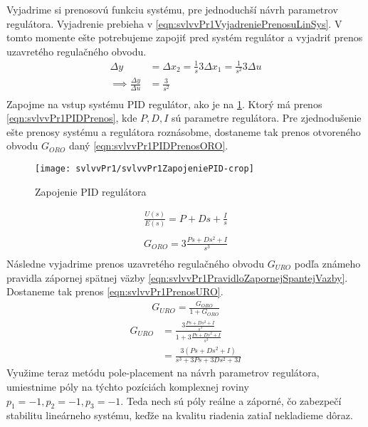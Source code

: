 \documentclass[../main.tex]{subfiles}
\begin{document}
	Vyjadrime si prenosovú funkciu systému, pre jednoduchší návrh parametrov regulátora. Vyjadrenie prebieha v \cref{eqn:svlvvPr1VyjadreniePrenosuLinSys}. V tomto momente ešte potrebujeme zapojiť pred systém regulátor a vyjadriť prenos uzavretého regulačného obvodu.
	\begin{equation}
	\begin{aligned}
		\Delta  y &= \Delta x_2 = \frac{1}{s}  3 \Delta x_1 = \frac{1}{s^2}  3 \Delta u \\
		\implies \frac{\Delta y}{\Delta u } &= \frac{3}{s^2} \\
	\end{aligned}
	\label{eqn:svlvvPr1VyjadreniePrenosuLinSys}
	\end{equation}
	Zapojme na vstup systému PID regulátor, ako je na \cref{fig:svlvvPr1ZapojeinePIDNaLinSys}. Ktorý má prenos \cref{eqn:svlvvPr1PIDPrenos}, kde $P, D, I$ sú parametre regulátora. Pre zjednodušenie ešte prenosy systému a regulátora roznásobme, dostaneme tak prenos otvoreného obvodu $G_{ORO}$ daný \cref{eqn:svlvvPr1PIDPrenosORO}. 
	\begin{figure}[h!]
		\centering
		\texttt{[image: svlvvPr1/svlvvPr1ZapojeniePID-crop]}
		\caption{Zapojenie PID regulátora}
		\label{fig:svlvvPr1ZapojeinePIDNaLinSys}
	\end{figure}
	\begin{equation}
		\begin{aligned}
			\frac{U(s)}{E(s)} = P + Ds + \frac{I}{s} \\
		\end{aligned}
		\label{eqn:svlvvPr1PIDPrenos}
	\end{equation}
	\begin{equation}
	\begin{aligned}
	G_{ORO} = 3\frac{Ps + Ds^2 + I}{s^3} \\
	\end{aligned}
	\label{eqn:svlvvPr1PIDPrenosORO}
	\end{equation}
	Následne vyjadrime prenos uzavretého regulačného obvodu $G_{URO}$ podľa známeho pravidla zápornej spätnej väzby \cref{eqn:svlvvPr1PravidloZapornejSpantejVazby}. Dostaneme tak prenos \cref{eqn:svlvvPr1PrenosURO}.
	\begin{equation}
			\begin{aligned}
			G_{URO} = \frac{G_{ORO}}{1 + G_{ORO}}
			\end{aligned}
			\label{eqn:svlvvPr1PravidloZapornejSpantejVazby}
	\end{equation}
	\begin{equation}
		\begin{aligned}
		G_{URO} &= \frac{3\frac{Ps + Ds^2 + I}{s^3}}{1 + 3\frac{Ps + Ds^2 + I}{s^3}}  \\
		 		&= \frac{3(Ps + Ds^2 + I)}{s^3 + 3Ps + 3Ds^2 + 3I}
		\end{aligned}
		\label{eqn:svlvvPr1PrenosURO}
	\end{equation}
	Využime teraz metódu pole-placement na návrh parametrov regulátora, umiestnime póly na týchto pozíciách komplexnej roviny $p_1 = -1, p_2 = -1, p_3 = -1$. Teda nech sú póly reálne a záporné, čo zabezpečí stabilitu lineárneho systému, keďže na kvalitu riadenia zatiaľ nekladieme dôraz.
\end{document}

